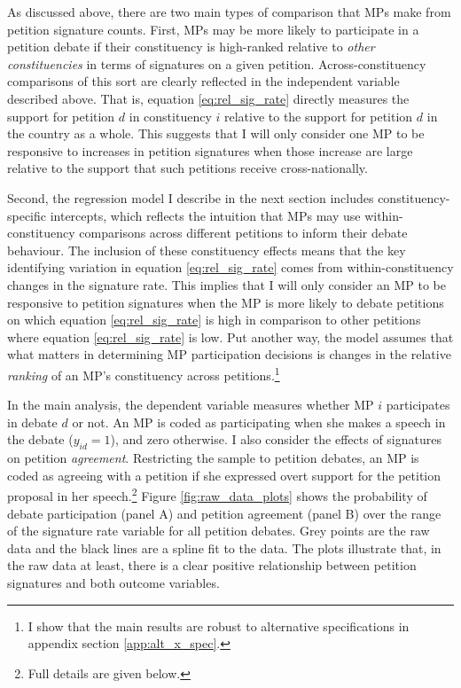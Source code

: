 \documentclass[12pt]{article}
\begin{document}
As discussed above, there are two main types of comparison that MPs make from petition signature counts. First, MPs may be more likely to participate in a petition debate if their constituency is high-ranked relative to \emph{other constituencies} in terms of signatures on a given petition. Across-constituency comparisons of this sort are clearly reflected in the independent variable described above. That is, equation \ref{eq:rel_sig_rate} directly measures the support for petition $d$ in constituency $i$ relative to the support for petition $d$ in the country as a whole. This suggests that I will only consider one MP to be responsive to increases in petition signatures when those increase are large relative to the support that such petitions receive cross-nationally.

Second, the regression model I describe in the next section includes constituency-specific intercepts, which reflects the intuition that MPs may use within-constituency comparisons across different petitions to inform their debate behaviour. The inclusion of these constituency effects means that the key identifying variation in equation \ref{eq:rel_sig_rate} comes from within-constituency changes in the signature rate. This implies that I will only consider an MP to be responsive to petition signatures when the MP is more likely to debate petitions on which equation \ref{eq:rel_sig_rate} is high in comparison to other petitions where equation \ref{eq:rel_sig_rate} is low. Put another way, the model assumes that what matters in determining MP participation decisions is changes in the relative \emph{ranking} of an MP's constituency across petitions.\footnote{I show that the main results are robust to alternative specifications in appendix section \ref{app:alt_x_spec}.}

In the main analysis, the dependent variable measures whether MP $i$ participates in debate $d$ or not. An MP is coded as participating when she makes a speech in the debate ($y_{id} = 1$), and zero otherwise. I also consider the effects of signatures on petition \emph{agreement}. Restricting the sample to petition debates, an MP is coded as agreeing with a petition if she expressed overt support for the petition proposal in her speech.\footnote{Full details are given below.} Figure \ref{fig:raw_data_plots} shows the probability of debate participation (panel A) and petition agreement (panel B) over the range of the signature rate variable for all petition debates. Grey points are the raw data and the black lines are a spline fit to the data. The plots illustrate that, in the raw data at least, there is a clear positive relationship between petition signatures and both outcome variables. 
\end{document}
